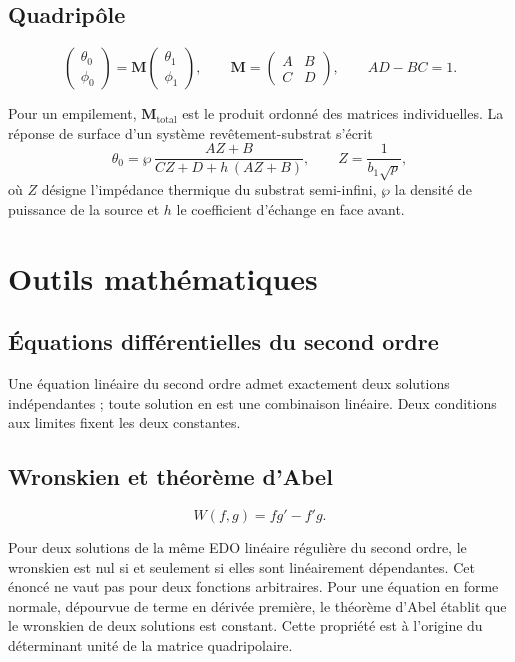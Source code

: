 \documentclass[11pt,a4paper]{article}
\begin{document}
\subsection{Quadripôle}

\[ \begin{pmatrix}\theta_{0}\\ \phi_{0}\end{pmatrix}
= \mathbf{M}\begin{pmatrix}\theta_{1}\\ \phi_{1}\end{pmatrix} ,
\qquad
\mathbf{M} = \begin{pmatrix} A & B \\ C & D \end{pmatrix} ,
\qquad
AD - BC = 1 . \]

Pour un empilement, $\mathbf{M}_{\text{total}}$ est le produit ordonné des matrices individuelles. La
réponse de surface d'un système revêtement-substrat s'écrit
\[ \theta_{0} = \wp\,\frac{AZ + B}{CZ + D + h\,(AZ+B)} ,
\qquad Z = \frac{1}{b_{1}\sqrt{p}} , \]
où $Z$ désigne l'impédance thermique du substrat semi-infini, $\wp$ la densité de puissance de la
source et $h$ le coefficient d'échange en face avant.

\section{Outils mathématiques}

\subsection{Équations différentielles du second ordre}

Une équation linéaire du second ordre admet exactement deux solutions indépendantes ; toute solution en
est une combinaison linéaire. Deux conditions aux limites fixent les deux constantes.

\subsection{Wronskien et théorème d'Abel}

\[ W(f,g) = f g' - f' g . \]

Pour deux solutions de la même EDO linéaire régulière du second ordre, le wronskien est nul si et seulement si elles sont linéairement dépendantes. Cet énoncé ne vaut pas pour deux fonctions arbitraires. Pour une équation en forme normale, dépourvue de terme en dérivée première, le
théorème d'Abel établit que le wronskien de deux solutions est constant. Cette propriété est à
l'origine du déterminant unité de la matrice quadripolaire.
\end{document}
